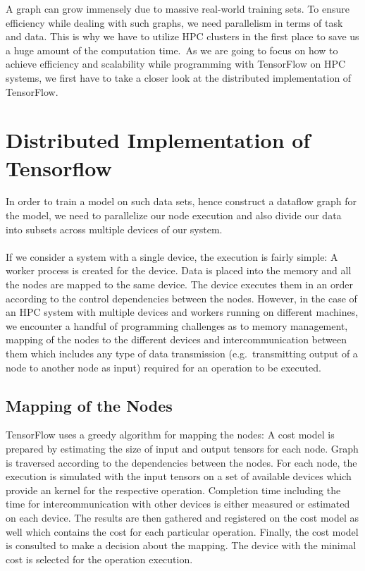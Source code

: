 \documentclass[ieeetran]{article}
\begin{document}
\hspace{-0.51cm}A graph can grow immensely due to massive real-world training sets. To ensure efficiency while dealing with such graphs, we need parallelism in terms of task and data. This is why we have to utilize HPC clusters in the first place to save us a huge amount of the computation time.\ As we are going to focus on how to achieve efficiency and scalability while programming with TensorFlow on HPC systems, we first have to take a closer look at the distributed implementation of TensorFlow.


\section{Distributed Implementation of Tensorflow} %
\label{sec:multiple_device_execution_of_a_graph}
In order to train a model on such data sets, hence construct a dataflow graph for the model, we need to parallelize our node execution and also divide our data into subsets across multiple devices of our system.
\\ \\If we consider a system with a single device, the execution is fairly simple: A worker process is created for the device. Data is placed into the memory and all the nodes are mapped to the same device. The device executes them in an order according to the control dependencies between the nodes. However, in the case of an HPC system with multiple devices and workers running on different machines, we encounter a handful of programming challenges as to memory management, mapping of the nodes to the different devices and intercommunication between them which includes any type of data transmission (e.g.\ transmitting output of a node to another node as input) required for an operation to be executed.

\subsection{Mapping of the Nodes} %
\label{sub:mapping_of_nodes} 
TensorFlow uses a greedy algorithm for mapping the nodes: A cost model is prepared by estimating the size of input and output tensors for each node. Graph is traversed according to the dependencies between the nodes. For each node, the execution is simulated with the input tensors on a set of available devices which provide an kernel for the respective operation. Completion time including the time for intercommunication with other devices is either measured or estimated on each device. The results are then gathered and registered on the cost model as well which contains the cost for each particular operation. Finally, the cost model is consulted to make a decision about the mapping. The device with the minimal cost is selected for the operation execution.
\end{document}
